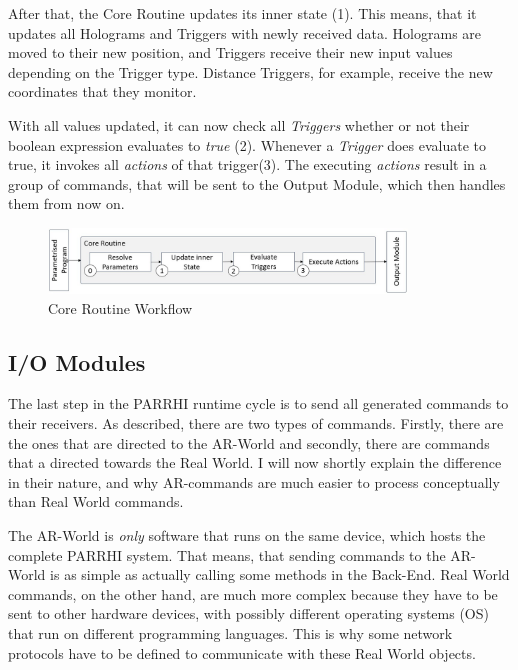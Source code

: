 After that, the Core Routine updates its inner state (1). This means, that it updates all Holograms and Triggers with newly received data. Holograms are moved to their new position, and Triggers receive their new input values depending on the Trigger type. Distance Triggers, for example, receive the new coordinates that they monitor.

With all values updated, it can now check all \textit{Triggers} whether or not their boolean expression evaluates to \textit{true} (2). Whenever a \textit{Trigger} does evaluate to true, it invokes all \textit{actions} of that trigger(3). The executing \textit{actions} result in a group of commands, that will be sent to the Output Module, which then handles them from now on. 

\begin{figure}[!h]
	\centering
	\includegraphics[width=0.85\textwidth]{Figures/CoreRoutine.jpg}
	\caption{Core Routine Workflow}
	\label{Fig:CoreRoutine}
\end{figure}

\subsection{I/O Modules}

The last step in the PARRHI runtime cycle is to send all generated commands to their receivers. As described, there are two types of commands. Firstly, there are the ones that are directed to the AR-World and secondly, there are commands that a directed towards the Real World. I will now shortly explain the difference in their nature, and why AR-commands are much easier to process conceptually than Real World commands.

The AR-World is \textit{only} software that runs on the same device, which hosts the complete PARRHI system. That means, that sending commands to the AR-World is as simple as actually calling some methods in the Back-End. Real World commands, on the other hand, are much more complex because they have to be sent to other hardware devices, with possibly different operating systems (OS) that run on different programming languages. This is why some network protocols have to be defined to communicate with these Real World objects. 

